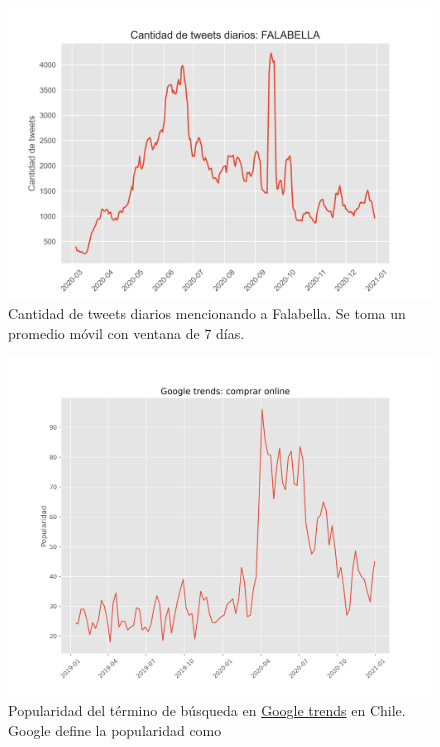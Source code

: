 \documentclass{article}
\begin{document}
\begin{figure}[H]
	\centering
	\includegraphics[scale=.55]{imgs/falabella_volume.png}
	\caption{Cantidad de tweets diarios mencionando a Falabella. Se toma un promedio móvil con ventana de $7$ días.}
	\label{fig:falabella_volume}
\end{figure}
\begin{figure}[H]
	\centering
	\includegraphics[scale=.42]{imgs/google_trend_compra_online.png}
	\caption{Popularidad del término de búsqueda  en \href{https://trends.google.es/trends/?geo=CL}{Google trends} en Chile. Google define la popularidad como }
	\label{fig:google_trend_compra_online}
\end{figure}
\end{document}

